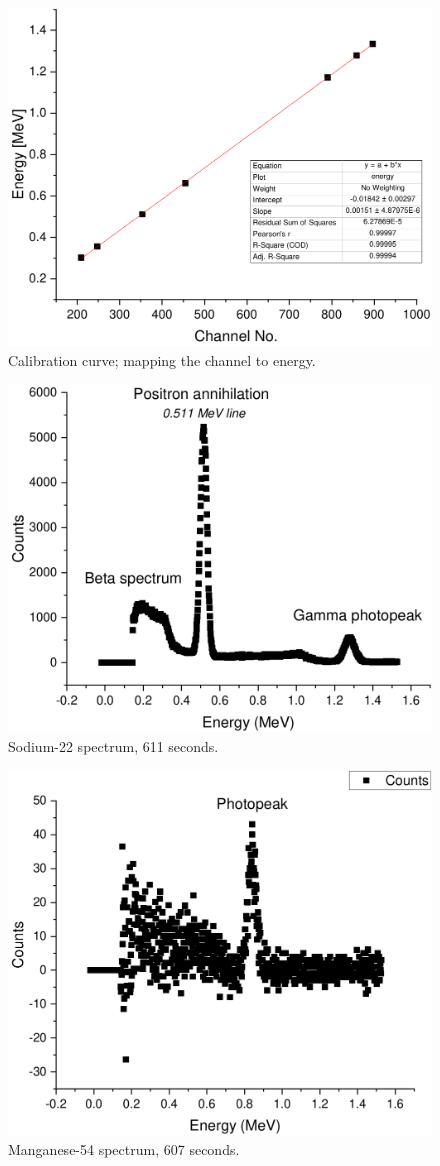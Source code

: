 \documentclass[notitlepage]{report}
\begin{document}
		
	\begin{figure}[p]
	\centering
	\includegraphics[width=0.7\linewidth]{callibration}
	\caption{Calibration curve; mapping the channel to energy.}
	\label{fig:callibration}
\end{figure}
\begin{figure}[p]
	\centering
	\includegraphics[width=0.7\linewidth]{na22}
	\caption{Sodium-22 spectrum, 611 seconds.}
	\label{fig:na22}
\end{figure}
\begin{figure}[p]
	\centering
	\includegraphics[width=0.7\linewidth]{mn54}
	\caption{Manganese-54 spectrum, 607 seconds.}
	\label{fig:mn54}
\end{figure}
\end{document}
